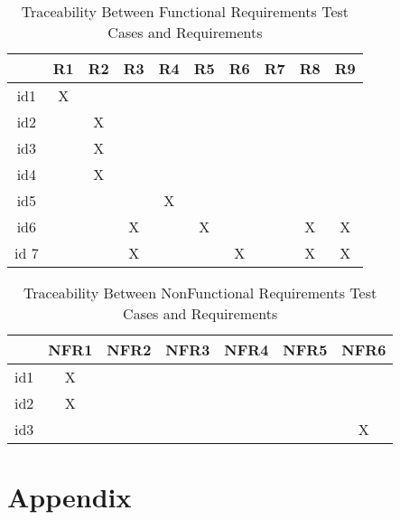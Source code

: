 \documentclass[12pt, titlepage]{article}
\begin{document}
\begin{table}[h!]
\centering
\begin{tabular}{|c|c|c|c|c|c|c|c|c|c|}
\hline        
	& R1& R2 & R3 &R4 & R5 &R6  &R7 &R8 &R9 \\
\hline
id1        & X &    &     &    &    &    &   &    &    \\ \hline
id2        &    & X &     &    &    &    &   &    &     \\ \hline
id3        &     & X &     &    &    &    &   &    &    \\ \hline
id4        &     & X &     &    &    &    &   &    &      \\ \hline
id5        &    &    &     & X &    &    &   &    &     \\  \hline
id6       &    &    & X &     & X  &    &    & X & X   \\ \hline
id 7      &    &    & X &    &    &  X  &    & X & X \\ \hline


\hline
\end{tabular}
\caption{Traceability Between Functional Requirements Test Cases and
Requirements}
\label{Table:trace}
\end{table}

\begin{table}[h!]
\centering
\begin{tabular}{|c|c|c|c|c|c|c|}
\hline        
	& NFR1& NFR2 & NFR3 &NFR4 & NFR5 &NFR6 \\
\hline
id1        & X &    &     &    &    &     \\ \hline
id2        & X &    &     &    &    &     \\ \hline
id3        &    &    &     &    &    & X  \\ \hline


\hline
\end{tabular}
\caption{Traceability Between NonFunctional Requirements Test Cases and
Requirements}
\label{Table:trace}
\end{table}




\newpage


 
%


\newpage

\section{Appendix}
\end{document}
